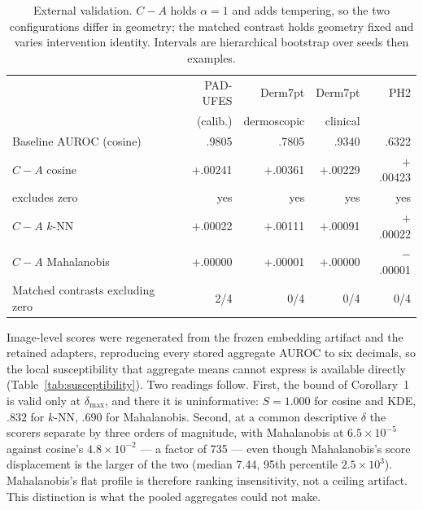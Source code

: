 \documentclass[pdflatex,sn-basic]{sn-jnl}
\theoremstyle{plain}
\theoremstyle{definition}
\theoremstyle{remark}
\begin{document}
\begin{table}[t]
\centering
\caption{External validation. $C-A$ holds $\alpha=1$ and adds tempering, so the two configurations differ in geometry; the matched contrast holds geometry fixed and varies intervention identity. Intervals are hierarchical bootstrap over seeds then examples.}
\label{tab:external}
\small
\begin{tabular}{lrrrr}
\toprule
& PAD-UFES & Derm7pt & Derm7pt & PH2\\
& (calib.) & dermoscopic & clinical & \\
\midrule
Baseline AUROC (cosine) & .9805 & .7805 & .9340 & .6322\\
\midrule
$C-A$ cosine & $+$.00241 & $+$.00361 & $+$.00229 & $+$.00423\\
\quad excludes zero & yes & yes & yes & yes\\
$C-A$ $k$-NN & $+$.00022 & $+$.00111 & $+$.00091 & $+$.00022\\
$C-A$ Mahalanobis & $+$.00000 & $+$.00001 & $+$.00000 & $-$.00001\\
\midrule
Matched contrasts excluding zero & 2/4 & 0/4 & 0/4 & 0/4\\
\bottomrule
\end{tabular}
\end{table}

Image-level scores were regenerated from the frozen embedding artifact and the retained adapters, reproducing every stored aggregate AUROC to six decimals, so the local susceptibility that aggregate means cannot express is available directly (Table~\ref{tab:susceptibility}). Two readings follow. First, the bound of Corollary~1 is valid only at $\delta_{\max}$, and there it is uninformative: $S=1.000$ for cosine and KDE, $.832$ for $k$-NN, $.690$ for Mahalanobis. Second, at a common descriptive $\delta$ the scorers separate by three orders of magnitude, with Mahalanobis at $6.5\times10^{-5}$ against cosine's $4.8\times10^{-2}$ --- a factor of 735 --- even though Mahalanobis's score displacement is the larger of the two (median 7.44, 95th percentile $2.5\times10^{3}$). Mahalanobis's flat profile is therefore ranking insensitivity, not a ceiling artifact. This distinction is what the pooled aggregates could not make.
\end{document}
